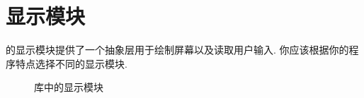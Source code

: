 \section{显示模块}
\indent\urwid{} 的显示模块提供了一个抽象层用于绘制屏幕以及读取用户输入. 你应该根据你的程序特点选择不同的显示模块.

\begin{figure}[!htb]
    \centering
    
    \caption{\urwid{} 库中的显示模块}
    \label{fig:display_models_of_urwid_library}
\end{figure}